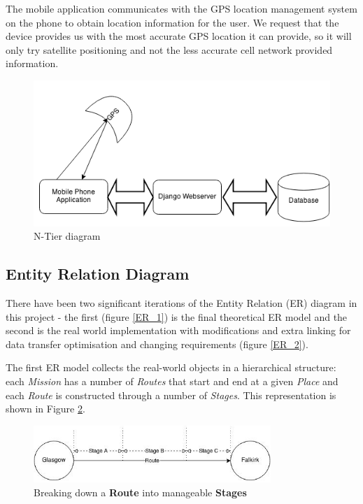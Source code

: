 The mobile application communicates with the GPS location
management system on the phone to obtain location information for the
user. We request that the device provides us with the most
accurate GPS location it can provide, so it will only try satellite
positioning and not the less accurate cell network provided information.
\begin{figure}[H]
  \centering
  \includegraphics[width=\textwidth]{images/N-tier.png}
  \caption{N-Tier diagram}
  \label{NTier}
\end{figure}

\subsection{Entity Relation Diagram}
\label{sec:ER}
There have been two significant iterations of the Entity Relation (ER)
diagram in this project - the first (figure \ref{ER_1}) is the final
theoretical ER model and the second is the real world implementation
with modifications and extra linking for data transfer optimisation
and changing requirements (figure \ref{ER_2}).

The first ER model collects the real-world objects in a hierarchical
structure: each \emph{Mission} has a number of \emph{Routes} that
start and end at a given \emph{Place} and each \emph{Route} is
constructed through a number of \emph{Stages}. This representation
is shown in Figure \ref{fig:route_breakdown}.

\begin{figure}[h]
  \centering
  \includegraphics[width=0.8\textwidth]{images/route_breakdown.jpg}
  \caption{Breaking down a \textbf{Route} into manageable
    \textbf{Stages}}
  \label{fig:route_breakdown}
\end{figure}


